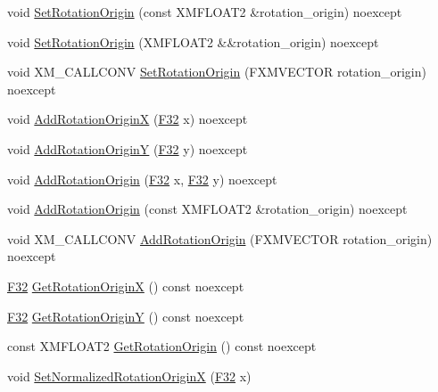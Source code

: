\begin{DoxyCompactItemize}
\item 
void \hyperlink{structmage_1_1_sprite_transform_a93070ec524ff5828f8040c103dee41a4}{Set\+Rotation\+Origin} (const X\+M\+F\+L\+O\+A\+T2 \&rotation\+\_\+origin) noexcept
\item 
void \hyperlink{structmage_1_1_sprite_transform_a532771d53e650543d125ffb652671388}{Set\+Rotation\+Origin} (X\+M\+F\+L\+O\+A\+T2 \&\&rotation\+\_\+origin) noexcept
\item 
void X\+M\+\_\+\+C\+A\+L\+L\+C\+O\+NV \hyperlink{structmage_1_1_sprite_transform_acbb3eebc3fd26d616f5e4ca75a8c112b}{Set\+Rotation\+Origin} (F\+X\+M\+V\+E\+C\+T\+OR rotation\+\_\+origin) noexcept
\item 
void \hyperlink{structmage_1_1_sprite_transform_a784e2f78ba65645ad2c40b4d249c744a}{Add\+Rotation\+OriginX} (\hyperlink{namespacemage_aa97e833b45f06d60a0a9c4fc22ae02c0}{F32} x) noexcept
\item 
void \hyperlink{structmage_1_1_sprite_transform_aa6fa39d59d2bd73d1b51ffbe185175a7}{Add\+Rotation\+OriginY} (\hyperlink{namespacemage_aa97e833b45f06d60a0a9c4fc22ae02c0}{F32} y) noexcept
\item 
void \hyperlink{structmage_1_1_sprite_transform_adc0912e49d43143f7fe5c8fc1c25dacf}{Add\+Rotation\+Origin} (\hyperlink{namespacemage_aa97e833b45f06d60a0a9c4fc22ae02c0}{F32} x, \hyperlink{namespacemage_aa97e833b45f06d60a0a9c4fc22ae02c0}{F32} y) noexcept
\item 
void \hyperlink{structmage_1_1_sprite_transform_a540e9757575ce46edcfea9ea5dcac19b}{Add\+Rotation\+Origin} (const X\+M\+F\+L\+O\+A\+T2 \&rotation\+\_\+origin) noexcept
\item 
void X\+M\+\_\+\+C\+A\+L\+L\+C\+O\+NV \hyperlink{structmage_1_1_sprite_transform_a8f1ce16eb9c07a4f798e93bf58eb2b46}{Add\+Rotation\+Origin} (F\+X\+M\+V\+E\+C\+T\+OR rotation\+\_\+origin) noexcept
\item 
\hyperlink{namespacemage_aa97e833b45f06d60a0a9c4fc22ae02c0}{F32} \hyperlink{structmage_1_1_sprite_transform_a980beb77dc4b64a2d784361d61981f9c}{Get\+Rotation\+OriginX} () const noexcept
\item 
\hyperlink{namespacemage_aa97e833b45f06d60a0a9c4fc22ae02c0}{F32} \hyperlink{structmage_1_1_sprite_transform_a762326097353f1303eede1b716cb9f51}{Get\+Rotation\+OriginY} () const noexcept
\item 
const X\+M\+F\+L\+O\+A\+T2 \hyperlink{structmage_1_1_sprite_transform_aa7a6f3cad38ed9231455de722e60040c}{Get\+Rotation\+Origin} () const noexcept
\item 
void \hyperlink{structmage_1_1_sprite_transform_a01087d541331e849727c7b8d338bab6e}{Set\+Normalized\+Rotation\+OriginX} (\hyperlink{namespacemage_aa97e833b45f06d60a0a9c4fc22ae02c0}{F32} x)

\end{DoxyCompactItemize}
